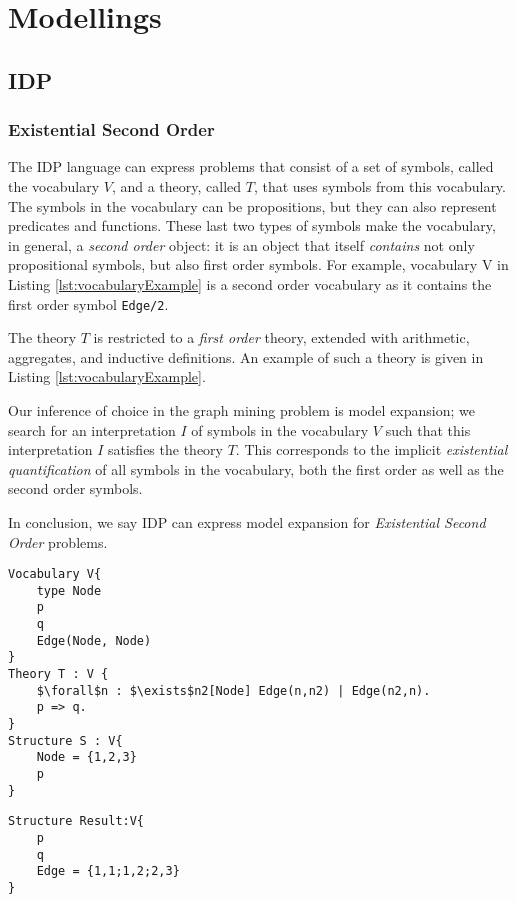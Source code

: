 \documentclass{article}
\theoremstyle{definition}
\begin{document}
\section{Modellings}
\subsection{IDP}
\subsubsection{Existential Second Order}
The IDP language can express problems that consist of a set of symbols, called the vocabulary $V$, and a theory, called $T$, that uses symbols from this vocabulary.
The symbols in the vocabulary can be propositions, but they can also represent predicates and functions.
These last two types of symbols make the vocabulary, in general, a \emph{second order} object: it is an object that itself \emph{contains} not only propositional symbols, but also first order symbols.
For example, vocabulary V in Listing \ref{lst:vocabularyExample} is a second order vocabulary as it contains the first order symbol \lstinline{Edge/2}.

The theory $T$ is restricted to a \emph{first order} theory, extended with arithmetic, aggregates, and inductive definitions.
An example of such a theory is given in Listing \ref{lst:vocabularyExample}.

Our inference of choice in the graph mining problem is model expansion; we search for an interpretation $I$ of symbols in the vocabulary $V$ such that this interpretation $I$ satisfies the theory $T$.
This corresponds to the implicit \emph{existential quantification} of all symbols in the vocabulary, both the first order as well as the second order symbols.

In conclusion, we say IDP can express model expansion for \emph{Existential Second Order} problems.

\begin{lstlisting}[mathescape,basicstyle=\fontfamily{lmvtt}\selectfont,caption=\ldots, label=lst:vocabularyExample]
Vocabulary V{
    type Node
    p
    q
    Edge(Node, Node)
}
Theory T : V {
    $\forall$n : $\exists$n2[Node] Edge(n,n2) | Edge(n2,n).
    p => q.
}
Structure S : V{
    Node = {1,2,3}
    p
}
\end{lstlisting}
\begin{lstlisting}
Structure Result:V{
    p
    q
    Edge = {1,1;1,2;2,3}
}
\end{lstlisting}
\end{document}
